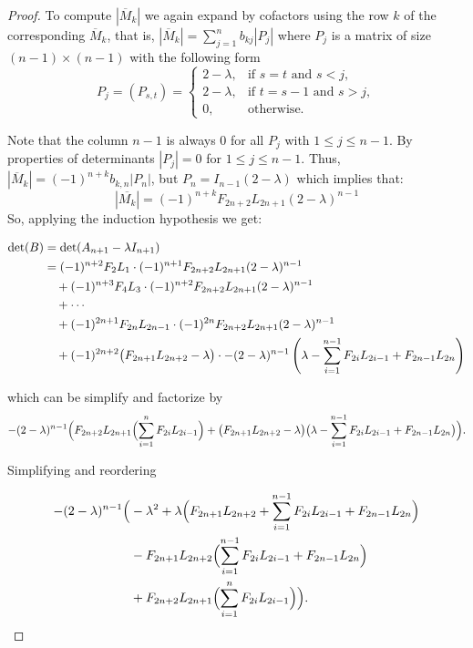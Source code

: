 \documentclass[11pt]{birkjour}
\theoremstyle{definition}
\theoremstyle{remark}
\numberwithin{equation}{section}
\begin{document}
\begin{proof}
\noindent To compute $|\overline{M}_k|$ we again expand by cofactors using the row $k$ of the corresponding $\overline{M}_k$, that is, $|\overline{M}_k|=\displaystyle \sum_{j=1}^{n}b_{kj}|P_j|$ where $P_j$ is a matrix of size $(n-1)\times(n-1)$ with the following form
\[
P_j = (P_{s,t})=
\begin{cases}
2 - \lambda, & \text{if } s = t \text{ and } s < j, \\
2 - \lambda, & \text{if } t = s - 1 \text{ and } s > j, \\
0,           & \text{otherwise}.
\end{cases}
\]

\noindent Note that the column $n-1$ is always $0$ for all $P_j$ with $1\leq j \leq n-1$. By properties of determinants $|P_j|=0$ for $1\leq j \leq n-1$. Thus, $|\overline{M}_k|=(-1)^{n+k}b_{k,n}|P_n|$, but $P_n=I_{n-1}(2-\lambda)$ which implies that: 
\[|\overline{M_{k}}|=(-1)^{n+k}F_{2n+2}L_{2n+1}(2-\lambda)^{n-1}\]
So, applying the induction hypothesis we get: 

\begin{align}
\operatorname{det}(B)
&= \operatorname{det}(A_{n+1}-\lambda I_{n+1}) \notag \\
&= (-1)^{n+2}F_{2}L_{1}\cdot(-1)^{n+1}F_{2n+2}L_{2n+1}(2-\lambda)^{n-1} \notag \\
&\quad + (-1)^{n+3}F_{4}L_{3}\cdot(-1)^{n+2}F_{2n+2}L_{2n+1}(2-\lambda)^{n-1} \notag \\
&\quad + \cdots \notag \\
&\quad + (-1)^{2n+1}F_{2n}L_{2n-1}\cdot(-1)^{2n}F_{2n+2}L_{2n+1}(2-\lambda)^{n-1} \notag \\
&\quad + (-1)^{2n+2}\bigl(F_{2n+1}L_{2n+2}-\lambda\bigr) \cdot -(2-\lambda)^{n-1}
\left(\lambda-\sum_{i=1}^{n-1}F_{2i}L_{2i-1}+F_{2n-1}L_{2n}\right)\notag
\end{align}

\noindent which can be simplify and factorize by 
\[
-(2-\lambda)^{n-1}\Bigl(
F_{2n+2}L_{2n+1}\Bigl( \sum_{i=1}^{n} F_{2i}L_{2i-1} \Bigr)
+\bigl(F_{2n+1}L_{2n+2}-\lambda\bigr)
\bigl(\lambda-\sum_{i=1}^{n-1}F_{2i}L_{2i-1}+F_{2n-1}L_{2n}\bigr)
\Bigr).
\]

\noindent Simplifying and reordering 

\[
\begin{aligned}
-(2-\lambda)^{n-1}\Bigl(
&-\lambda^{2}
+ \lambda\Bigl(
F_{2n+1}L_{2n+2}
+ \sum_{i=1}^{n-1} F_{2i}L_{2i-1}
+ F_{2n-1}L_{2n}
\Bigr) \\
&- F_{2n+1}L_{2n+2}
\Bigl(
\sum_{i=1}^{n-1} F_{2i}L_{2i-1}
+ F_{2n-1}L_{2n}
\Bigr) \\
&+ F_{2n+2}L_{2n+1}
\Bigl(
\sum_{i=1}^{n} F_{2i}L_{2i-1}
\Bigr)
\Bigr).
\end{aligned}
\]





\end{proof}
\end{document}
